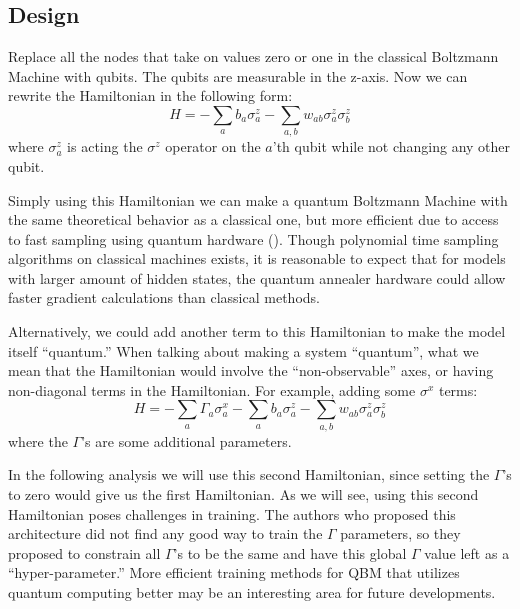 \documentclass[letterpaper,11pt]{article}
\begin{document}
\subsection{Design}
Replace all the nodes that take on values zero or one in the classical Boltzmann Machine with qubits. The qubits are measurable in the z-axis. Now we can rewrite the Hamiltonian in the following form:
\begin{equation} \label{QH}
H = - \sum_a b_a {\sigma}_a^z - \sum_{a,b} w_{ab} {\sigma}_a^z {\sigma}_b^z
\end{equation}
where ${\sigma}_a^z$ is acting the ${\sigma}^z$ operator on the $a$'th qubit while not changing any other qubit. \par

Simply using this Hamiltonian we can make a quantum Boltzmann Machine with the same theoretical behavior as a classical one, but more efficient due to access to fast sampling using quantum hardware (\cite{QBM}). Though  polynomial time sampling algorithms on classical machines exists, it is reasonable to expect that for models with larger amount of hidden states, the quantum annealer hardware could allow faster gradient calculations than classical methods. \par

Alternatively, we could add another term to this Hamiltonian to make the model itself ``quantum.'' When talking about making a system ``quantum'', what we mean that the Hamiltonian would involve the ``non-observable'' axes, or having non-diagonal terms in the Hamiltonian. For example, adding some ${\sigma}^x$ terms:
\begin{equation} \label{QH2}
H = - \sum_a \Gamma_a {\sigma}_a^x - \sum_a b_a {\sigma}_a^z - \sum_{a,b} w_{ab} {\sigma}_a^z {\sigma}_b^z
\end{equation} 
where the $\Gamma$'s are some additional parameters. \par

In the following analysis we will use this second Hamiltonian, since setting the $\Gamma$'s to zero would give us the first Hamiltonian. As we will see, using this second Hamiltonian poses challenges in training. The authors who proposed this architecture did not find any good way to train the $\Gamma$ parameters, so they proposed to constrain all $\Gamma$'s to be the same and have this global $\Gamma$ value left as a ``hyper-parameter.'' More efficient training methods for QBM that utilizes quantum computing better may be an interesting area for future developments. \par
\end{document}
